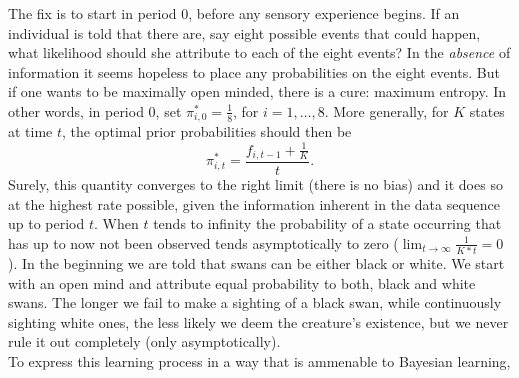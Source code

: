 \documentclass[11pt]{article}
\begin{document}
The fix is to start in period $0$, before any sensory experience begins. If an individual is told that there are, say eight possible events that could happen, what likelihood should she attribute to each of the eight events? In the \textit{absence} of information it seems hopeless to place any probabilities on the eight events. But if one wants to be maximally open minded, there is a cure: maximum entropy.  In other words, in period $0$, set $\pi_{i,0}^{*}=\frac{1}{8}$, for $i=1, \ldots, 8$. More generally, for $K$ states at time $t$, the optimal prior probabilities should then be
\begin{equation}  
\pi_{i, t}^{*}=\frac{f_{i, t-1}+\frac{1}{K}}{t}.
\end{equation}
Surely, this quantity converges to the right limit (there is no bias) and it does so at the highest rate possible, given the information inherent in the data sequence up to period $t$. When $t$ tends to infinity the probability of a state occurring that has up to now not been observed tends asymptotically to zero ($\lim_{t\rightarrow\infty}\frac{1}{K*t}=0$).  In the beginning we are told that swans can be either black or white. We start with an open mind and attribute equal probability to both, black and white swans. The longer we fail to make a sighting of a black swan, while continuously sighting white ones, the less likely we deem the creature's existence, but we never rule it out completely (only asymptotically). 
\\

To express this learning process in a way that is ammenable to Bayesian learning, 


\end{document}
